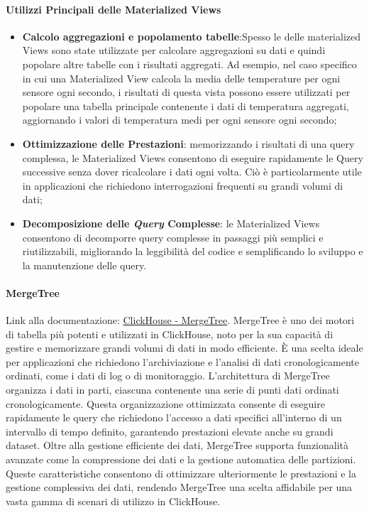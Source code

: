 \paragraph*{Utilizzi Principali delle Materialized Views}
\begin{itemize}
    \item \textbf{Calcolo aggregazioni e popolamento tabelle}:Spesso le delle materialized Views sono state utilizzate per calcolare aggregazioni su dati e quindi popolare altre tabelle con i risultati aggregati. Ad esempio, nel caso specifico in cui una Materialized View calcola la media delle temperature per ogni sensore ogni secondo, i risultati di questa vista possono essere utilizzati per popolare una tabella principale contenente i dati di temperatura aggregati, aggiornando i valori di temperatura medi per ogni sensore ogni secondo;
    \item \textbf{Ottimizzazione delle Prestazioni}: memorizzando i risultati di una query complessa, le Materialized Views consentono di eseguire rapidamente le Query successive senza dover ricalcolare i dati ogni volta. Ciò è particolarmente utile in applicazioni che richiedono interrogazioni frequenti su grandi volumi di dati;
    \item \textbf{Decomposizione delle \textit{Query} Complesse}: le Materialized Views consentono di decomporre query complesse in passaggi più semplici e riutilizzabili, migliorando la leggibilità del codice e semplificando lo sviluppo e la manutenzione delle query.
\end{itemize}



\paragraph{MergeTree}\label{sec:MergeTree}
Link alla documentazione: \href{https://clickhouse.com/docs/en/engines/table-engines/mergetree-family/mergetree#mergetree}{ClickHouse - MergeTree}.\newline
MergeTree è uno dei motori di tabella più potenti e utilizzati in ClickHouse, noto per la sua capacità di gestire e memorizzare grandi volumi di dati in modo efficiente. È una scelta ideale per applicazioni che richiedono l'archiviazione e l'analisi di dati cronologicamente ordinati, come i dati di log o di monitoraggio. L'architettura di MergeTree organizza i dati in parti, ciascuna contenente una serie di punti dati ordinati cronologicamente. Questa organizzazione ottimizzata consente di eseguire rapidamente le query che richiedono l'accesso a dati specifici all'interno di un intervallo di tempo definito, garantendo prestazioni elevate anche su grandi dataset. Oltre alla gestione efficiente dei dati, MergeTree supporta funzionalità avanzate come la compressione dei dati e la gestione automatica delle partizioni. Queste caratteristiche consentono di ottimizzare ulteriormente le prestazioni e la gestione complessiva dei dati, rendendo MergeTree una scelta affidabile per una vasta gamma di scenari di utilizzo in ClickHouse.



